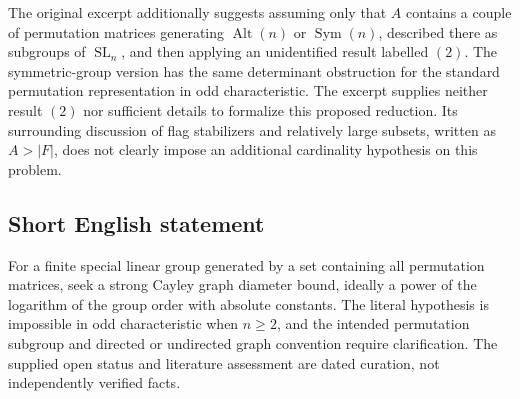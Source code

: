 \documentclass[11pt]{article}
\begin{document}
The original excerpt additionally suggests assuming only that \(A\) contains a couple of permutation matrices generating \(\operatorname{Alt}(n)\) or \(\operatorname{Sym}(n)\), described there as subgroups of \(\operatorname{SL}_n\), and then applying an unidentified result labelled \((2)\). The symmetric-group version has the same determinant obstruction for the standard permutation representation in odd characteristic. The excerpt supplies neither result \((2)\) nor sufficient details to formalize this proposed reduction. Its surrounding discussion of flag stabilizers and relatively large subsets, written as \(A>|F|\), does not clearly impose an additional cardinality hypothesis on this problem.
\subsection{Short English statement}
For a finite special linear group generated by a set containing all permutation matrices, seek a strong Cayley graph diameter bound, ideally a power of the logarithm of the group order with absolute constants. The literal hypothesis is impossible in odd characteristic when \(n\geq2\), and the intended permutation subgroup and directed or undirected graph convention require clarification. The supplied open status and literature assessment are dated curation, not independently verified facts.
\end{document}
